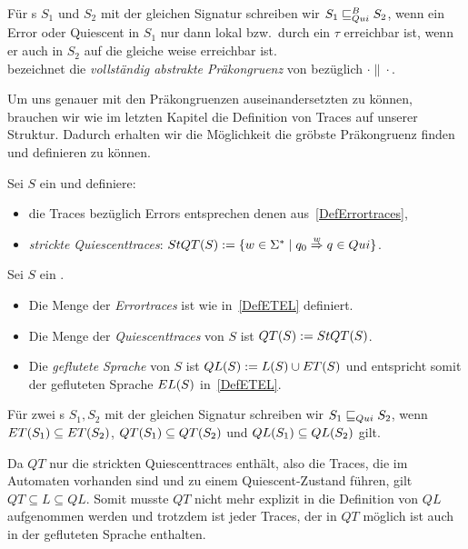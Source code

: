 \begin{Def}
  Für \EIO{}s $S_1$ und $S_2$ mit der gleichen Signatur schreiben wir
  $S_1\sqsubseteq _{Qui}^B S_2$, wenn ein Error oder Quiescent in $S_1$ nur dann lokal bzw.\
  durch ein $\tau$ erreichbar ist, wenn er auch in $S_2$ auf die gleiche weise
  erreichbar ist.\\
  \QCRel{} bezeichnet die \emph{vollständig abstrakte Präkongruenz} von
  \QBRel{} bezüglich $\cdot\|\cdot$.
\end{Def}

Um uns genauer mit den Präkongruenzen auseinandersetzten zu können, brauchen
wir wie im letzten Kapitel die Definition von Traces auf unserer Struktur.
Dadurch erhalten wir die Möglichkeit die gröbste Präkongruenz finden und
definieren zu können.

\begin{Def}
  \label{DefQuiescenttraces}
  Sei $S$ ein \EIO{} und definiere:
  \begin{itemize}
    \item die Traces bezüglich Errors entsprechen denen
      aus~\ref{DefErrortraces},
    \item \emph{strickte Quiescenttraces}: $StQT{}(S) := \{w\in\Sigma ^*\mid q_0
      \overset{w}{\Rightarrow} q\in Qui\}$.
  \end{itemize}
\end{Def}

\begin{Def}
  \label{DefQTQL}
  Sei $S$ ein \EIO{}.
  \begin{itemize}
    \item Die Menge der \emph{Errortraces} ist wie in~\ref{DefETEL} definiert.
    \item Die Menge der \emph{Quiescenttraces} von $S$ ist $QT{}(S) := StQT{}(S)$.
    \item Die \emph{geflutete Sprache} von $S$ ist $QL{}(S):=L(S)\cup ET{}(S)$
      und entspricht somit der gefluteten Sprache $EL{}(S)$ in~\ref{DefETEL}.
  \end{itemize}
  Für zwei \EIO{}s $S_1, S_2$ mit der gleichen Signatur schreiben wir
  $S_1\sqsubseteq _{Qui} S_2$, wenn $ET{}(S_1)\subseteq ET{}(S_2)$,
  $QT{}(S_1)\subseteq QT{}(S_2)$ und $QL{}(S_1)\subseteq QL{}(S_2)$ gilt.
\end{Def}

Da $QT$ nur die strickten Quiescenttraces enthält, also die Traces, die im
Automaten vorhanden sind und zu einem Quiescent-Zustand führen, gilt
$QT\subseteq L\subseteq QL$. Somit musste $QT$ nicht mehr explizit in die
Definition von $QL$ aufgenommen werden und trotzdem ist jeder Traces, der in
$QT$ möglich ist auch in der gefluteten Sprache enthalten.

